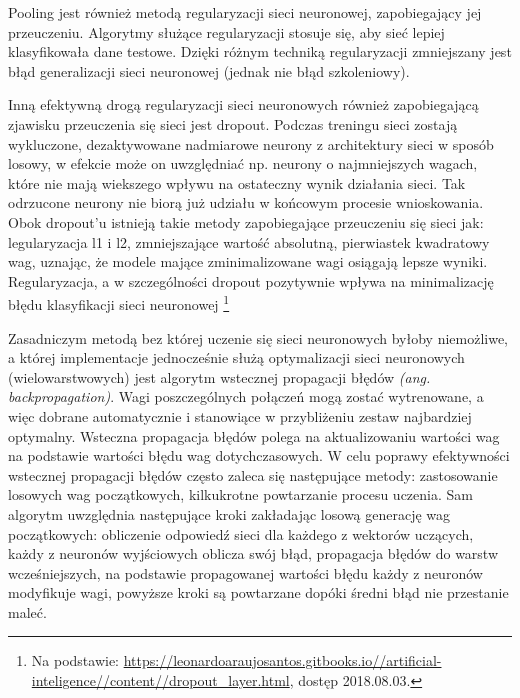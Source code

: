 \documentclass[a4paper,12pt]{article}
\begin{document}
			Pooling jest również metodą regularyzacji sieci neuronowej, zapobiegający jej przeuczeniu. Algorytmy służące regularyzacji stosuje się, aby sieć lepiej klasyfikowała dane testowe. Dzięki różnym techniką regularyzacji zmniejszany jest błąd generalizacji sieci neuronowej (jednak nie błąd szkoleniowy). 
        
        Inną efektywną drogą regularyzacji sieci neuronowych również zapobiegającą zjawisku przeuczenia się sieci jest dropout. 
			Podczas treningu sieci zostają wykluczone, dezaktywowane nadmiarowe neurony z architektury sieci w sposób losowy, 
			w efekcie może on uwzględniać np. neurony o najmniejszych wagach, które nie mają wiekszego wpływu na ostateczny wynik działania sieci. 
			Tak odrzucone neurony nie biorą już udziału w końcowym procesie wnioskowania. Obok dropout'u istnieją takie metody zapobiegające 
			przeuczeniu się sieci jak: legularyzacja l1 i l2, zmniejszające wartość absolutną, pierwiastek kwadratowy wag, uznając, że modele mające 
			zminimalizowane wagi osiągają lepsze wyniki. Regularyzacja, a w szczególności dropout pozytywnie wpływa na minimalizację błędu 
			klasyfikacji sieci neuronowej \footnote{Na podstawie:  \href{https://leonardoaraujosantos.gitbooks.io//artificial-inteligence//content//dropout_layer.html}{\url{https://leonardoaraujosantos.gitbooks.io//artificial-inteligence//content//dropout_layer.html}}, dostęp 2018.08.03.}
        
        Zasadniczym metodą bez której uczenie się sieci neuronowych byłoby niemożliwe, a której implementacje jednocześnie służą optymalizacji sieci neuronowych (wielowarstwowych) jest algorytm wstecznej propagacji błędów 
			\textit{(ang. backpropagation)}. Wagi poszczególnych połączeń mogą zostać wytrenowane, a więc dobrane automatycznie i stanowiące 
			w przybliżeniu zestaw najbardziej optymalny. Wsteczna propagacja błędów polega na aktualizowaniu wartości wag na podstawie wartości błędu 
			wag dotychczasowych. W celu poprawy efektywności wstecznej propagacji błędów często zaleca się następujące metody: 
			zastosowanie losowych wag początkowych, kilkukrotne powtarzanie procesu uczenia. Sam algorytm uwzględnia następujące kroki 
			zakładając losową generację wag początkowych: obliczenie odpowiedź sieci dla każdego z wektorów uczących, 
			każdy z neuronów wyjściowych oblicza swój błąd, propagacja błędów do warstw wcześniejszych, na podstawie propagowanej wartości 
			błędu każdy z neuronów modyfikuje wagi, powyższe kroki są powtarzane dopóki średni błąd nie przestanie maleć.
\end{document}
